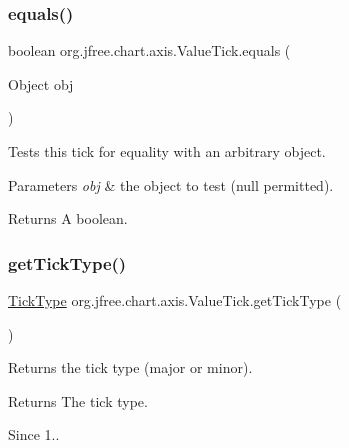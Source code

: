 \subsubsection{\texorpdfstring{equals()}{equals()}}
{\footnotesize\ttfamily boolean org.\+jfree.\+chart.\+axis.\+Value\+Tick.\+equals (\begin{DoxyParamCaption}\item[{Object}]{obj }\end{DoxyParamCaption})}

Tests this tick for equality with an arbitrary object.


\begin{DoxyParams}{Parameters}
{\em obj} & the object to test ({\ttfamily null} permitted).\\
\hline
\end{DoxyParams}
\begin{DoxyReturn}{Returns}
A boolean. 
\end{DoxyReturn}
\mbox{\label{classorg_1_1jfree_1_1chart_1_1axis_1_1_value_tick_aaae3b0f10e6645db5df13585cbb915eb}} 
\subsubsection{\texorpdfstring{get\+Tick\+Type()}{getTickType()}}
{\footnotesize\ttfamily \mbox{\hyperlink{classorg_1_1jfree_1_1chart_1_1axis_1_1_tick_type}{Tick\+Type}} org.\+jfree.\+chart.\+axis.\+Value\+Tick.\+get\+Tick\+Type (\begin{DoxyParamCaption}{ }\end{DoxyParamCaption})}

Returns the tick type (major or minor).

\begin{DoxyReturn}{Returns}
The tick type.
\end{DoxyReturn}
\begin{DoxySince}{Since}
1.. 
\end{DoxySince}
\mbox{\label{classorg_1_1jfree_1_1chart_1_1axis_1_1_value_tick_a4577d74617c0995204b5e675b8e60b08}} 
